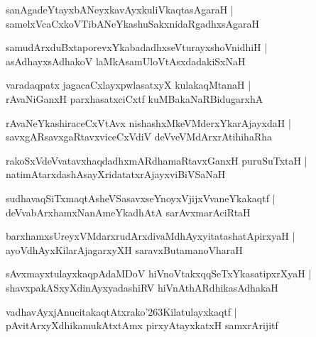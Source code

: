 \documentclass[twoside,12pt,openright]{book}
\def\S{\char'263}
\newcounter{shloka}[chapter]
\begin{document}
\begin{shloka}%
sanAgadeYtayxbANeyxkavAyxkuliVkaqtasAgaraH |\\
samelxVcaCxkoVTibANeYkashuSakxnidaRgadhxsAgaraH 
\end{shloka}

\begin{shloka}%
samudArxduBxtaporevxYkabadadhxseVturayxshoVnidhiH |\\
asAdhayxsAdhakoV laMkAsamUloVtAsxdadakiSxNaH 
\end{shloka}

\begin{shloka}%
varadaqpatx jagacaCxlayxpwlasatxyX kulakaqMtanaH |\\
rAvaNiGanxH parxhasatxciCxtf kuMBakaNaRBidugarxhA 
\end{shloka}

\begin{shloka}%
rAvaNeYkashiraceCxVtAvx nishashxMkeVMderxYkarAjayxdaH |\\
savxgARsavxgaRtavxviceCxVdiV deVveVMdArxrAtihihaRha 
\end{shloka}

\begin{shloka}%
rakoSxVdeVvatavxhaqdadhxmARdhamaRtavxGanxH puruSuTxtaH |\\
natimAtarxdashAsayXridatatxrAjayxviBiVSaNaH 
\end{shloka}

\begin{shloka}%
sudhavaqSiTxmaqtAsheVSasavxseYnoyxVjijxVvaneYkakaqtf |\\
deVvabArxhamxNanAmeYkadhAtA sarAvxmarAciRtaH 
\end{shloka}

\begin{shloka}%
barxhamxsUreyxVMdarxrudArxdivaMdhAyxyitatashatApirxyaH |\\
ayoVdhAyxKilarAjagarxyXH saravxButamanoVharaH 
\end{shloka}

\begin{shloka}%
sAvxmayxtulayxkaqpAdaMDoV hiVnoVtakxqqSeTxYkasatipxrXyaH |\\
shavxpakASxyXdinAyxyadashiRV hiVnAthARdhikasAdhakaH 
\end{shloka}

\begin{shloka}%
vadhavAyxjAnucitakaqtAtxrako\S Kilatulayxkaqtf |\\
pAvitArxyXdhikamukAtxtAmx pirxyAtayxkatxH samxrArijitf
\end{shloka}
\end{document}
